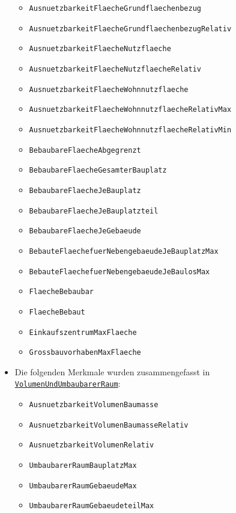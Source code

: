 \documentclass{article}
\newcommand{\mml}[1]{\texttt{#1}}
\newcommand{\merkmalref}[1]{\hyperref[merkmal:#1]{\mml{#1}}}
\begin{document}
\begin{itemize}
\begin{itemize}
    \item \mml{AusnuetzbarkeitFlaecheGrundflaechenbezug}
    \item \mml{AusnuetzbarkeitFlaecheGrundflaechenbezugRelativ}
    \item \mml{AusnuetzbarkeitFlaecheNutzflaeche}
    \item \mml{AusnuetzbarkeitFlaecheNutzflaecheRelativ}
    \item \mml{AusnuetzbarkeitFlaecheWohnnutzflaeche}
    \item \mml{AusnuetzbarkeitFlaecheWohnnutzflaecheRelativMax}
    \item \mml{AusnuetzbarkeitFlaecheWohnnutzflaecheRelativMin}
    \item \mml{BebaubareFlaecheAbgegrenzt}
    \item \mml{BebaubareFlaecheGesamterBauplatz}
    \item \mml{BebaubareFlaecheJeBauplatz}
    \item \mml{BebaubareFlaecheJeBauplatzteil}
    \item \mml{BebaubareFlaecheJeGebaeude}
    \item \mml{BebauteFlaechefuerNebengebaeudeJeBauplatzMax}
    \item \mml{BebauteFlaechefuerNebengebaeudeJeBaulosMax}
    \item \mml{FlaecheBebaubar}
    \item \mml{FlaecheBebaut}
    \item \mml{EinkaufszentrumMaxFlaeche}
    \item \mml{GrossbauvorhabenMaxFlaeche}
    \end{itemize}
  \item Die folgenden Merkmale wurden zusammengefasst in
    \merkmalref{VolumenUndUmbaubarerRaum}: 
    \begin{itemize}
    \item \mml{AusnuetzbarkeitVolumenBaumasse}
    \item \mml{AusnuetzbarkeitVolumenBaumasseRelativ}
    \item \mml{AusnuetzbarkeitVolumenRelativ}
    \item \mml{UmbaubarerRaumBauplatzMax}
    \item \mml{UmbaubarerRaumGebaeudeMax}
    \item \mml{UmbaubarerRaumGebaeudeteilMax}
    \end{itemize}

\end{itemize}
\end{document}
